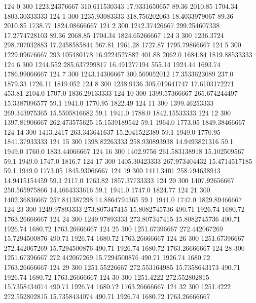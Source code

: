 124  0  300  1223.24376667  310.611530343  17.9331650657  89.36  2010.85  1704.34  1803.30333333 
124  1  300  1235.93083333  318.756202063  18.4033979067  89.36  2010.85  1738.77  1824.08666667 
124  2  300  1242.37426667  299.254607338  17.2774728103  89.36  2068.85  1704.34  1824.65266667 
124  3  300  1236.3724  298.707032883  17.2458585844  567.81  1961.28  1727.87  1795.79866667 
124  5  300  1229.09676667  293.105480178  16.9224527882  401.88  2062.0  1684.84  1819.88533333 
124  6  300  1244.552  285.637299817  16.491277194  555.14  1924.44  1693.74  1786.99066667 
124  7  300  1243.14306667  300.569052012  17.3533623089  237.0  1879.33  1726.11  1819.052 
124  8  300  1238.9136  305.019641747  17.6103172271  453.81  2104.0  1707.0  1836.29133333 
124  10  300  1399.57366667  265.674244497  15.3387096577  59.1  1941.0  1770.95  1822.49 
124  11  300  1399.46253333  269.343975365  15.5505816682  59.1  1941.0  1788.0  1842.15533333 
124  12  300  1397.81906667  262.473575625  15.1539189542  59.1  1964.0  1773.05  1849.38466667 
124  14  300  1413.2417  263.343641637  15.2041522389  59.1  1949.0  1770.95  1841.37933333 
124  15  300  1398.82263333  258.930893938  14.9493821316  59.1  1949.0  1760.0  1833.44066667 
124  16  300  1402.9756  261.583138918  15.102509567  59.1  1949.0  1747.0  1816.7 
124  17  300  1405.30423333  267.973404432  15.4714517185  59.1  1949.0  1773.05  1845.93066667 
124  19  300  1411.3401  258.794638943  14.9415154459  59.1  2117.0  1763.82  1857.37733333 
124  20  300  1407.92656667  250.565975866  14.4664333616  59.1  1941.0  1747.0  1824.77 
124  21  300  1402.36836667  257.841387298  14.8864794365  59.1  1941.0  1747.0  1829.89466667 
124  23  300  1249.97893333  273.807347415  15.8082745736  490.71  1926.74  1680.72  1763.26666667 
124  24  300  1249.97893333  273.807347415  15.8082745736  490.71  1926.74  1680.72  1763.26666667 
124  25  300  1251.67396667  272.442067269  15.7294500876  490.71  1926.74  1680.72  1763.26666667 
124  26  300  1251.67396667  272.442067269  15.7294500876  490.71  1926.74  1680.72  1763.26666667 
124  28  300  1251.67396667  272.442067269  15.7294500876  490.71  1926.74  1680.72  1763.26666667 
124  29  300  1251.55226667  272.553164985  15.7358643173  490.71  1926.74  1680.72  1763.26666667 
124  30  300  1251.4222  272.552802815  15.7358434074  490.71  1926.74  1680.72  1763.26666667 
124  32  300  1251.4222  272.552802815  15.7358434074  490.71  1926.74  1680.72  1763.26666667 

